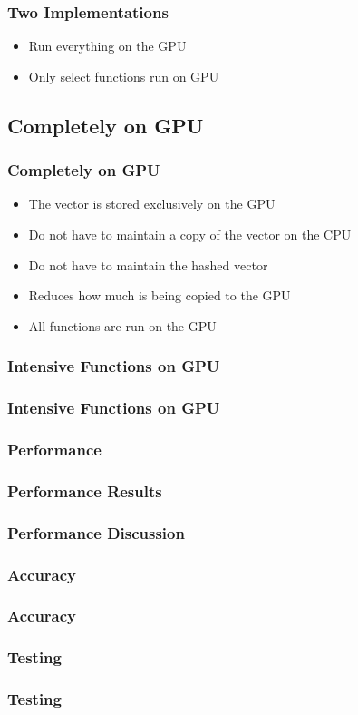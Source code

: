 \documentclass{beamer}
\newcommand\pro{\item[$+$]}
\newcommand\con{\item[$-$]}
\begin{document}
\begin{frame}
\frametitle{Two Implementations}
\begin{itemize}
\item Run everything on the GPU
\item Only select functions run on GPU
\end{itemize}
\end{frame}

\subsection{Completely on GPU}
\begin{frame}
\frametitle{Completely on GPU}
\begin{itemize}
\item The vector is stored exclusively on the GPU
\pro Do not have to maintain a copy of the vector on the CPU
\pro Do not have to maintain the hashed vector
\pro Reduces how much is being copied to the GPU
\con All functions are run on the GPU
\end{itemize}
\end{frame}

\subsubsection{Intensive Functions on GPU}
\begin{frame}
\frametitle{Intensive Functions on GPU}
\end{frame}

\subsubsection{Performance}
\begin{frame}
\frametitle{Performance Results}
\end{frame}

\begin{frame}
\frametitle{Performance Discussion}
\end{frame}

\subsubsection{Accuracy}
\begin{frame}
\frametitle{Accuracy}
\end{frame}

\subsubsection{Testing}
\begin{frame}
\frametitle{Testing}
\end{frame}
\end{document}

